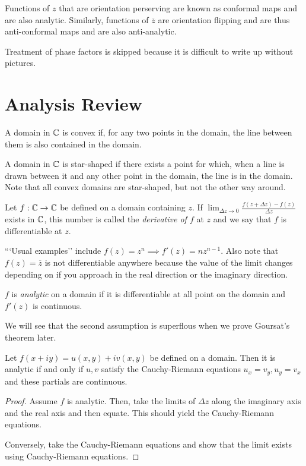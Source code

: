 \documentclass[11pt,leqno,oneside]{amsart}
\begin{document}
\begin{defn}
    Functions of $z$ that are orientation perserving are known as conformal
    maps and are also analytic. Similarly, functions of $\overline{z}$ are
    orientation flipping and are thus anti-conformal maps and are also
    anti-analytic.
\end{defn}

Treatment of phase factors is skipped because it is difficult to write up
without pictures.

\section*{Analysis Review}

\begin{defn}
A domain in ${\mathbb C}$ is convex if, for any two points in the domain, the line
between them is also contained in the domain.
\end{defn}
\begin{defn}
    A domain in ${\mathbb C}$ is star-shaped if there exists a point for which, when a
    line is drawn between it and any other point in the domain, the line is in
    the domain. Note that all convex domains are star-shaped, but not the other
    way around.
\end{defn}
\begin{defn}
    Let $f: {\mathbb C} \to {\mathbb C}$ be defined on a domain containing $z$. If $\lim_{\Delta
    z \to 0} \frac{f(z+\Delta z) - f(z)}{\Delta z}$ exists in ${\mathbb C}$, this number
    is called the \emph{derivative of $f$} at $z$ and we say that $f$ is
    differentiable at $z$.
\end{defn}

```Usual examples'' include $f(z) = z^n \implies f'(z) = nz^{n-1}$. Also note
that $f(z) = \overline{z}$ is not differentiable anywhere because the value of
the limit changes depending on if you approach in the real direction or the
imaginary direction.
\begin{defn}
    $f$ is \emph{analytic} on a domain if it is differentiable at all point on
    the domain and $f'(z)$ is continuous.
\end{defn}
We will see that the second assumption is superflous when we prove Goursat's
theorem later.

\begin{thm}
    Let $f(x+iy) = u(x,y)+iv(x,y)$ be defined on a domain. Then it is analytic
    if and only if $u,v$ satisfy the Cauchy-Riemann equations $u_x = v_y, u_y =
    v_x$ and these partials are continuous.
\end{thm}
\begin{proof}
    Assume $f$ is analytic. Then, take the limits of $\Delta z$ along the
    imaginary axis and the real axis and then equate. This should yield the
    Cauchy-Riemann equations.

    Conversely, take the Cauchy-Riemann equations and show that the limit
    exists using Cauchy-Riemann equations.
\end{proof}
\end{document}
